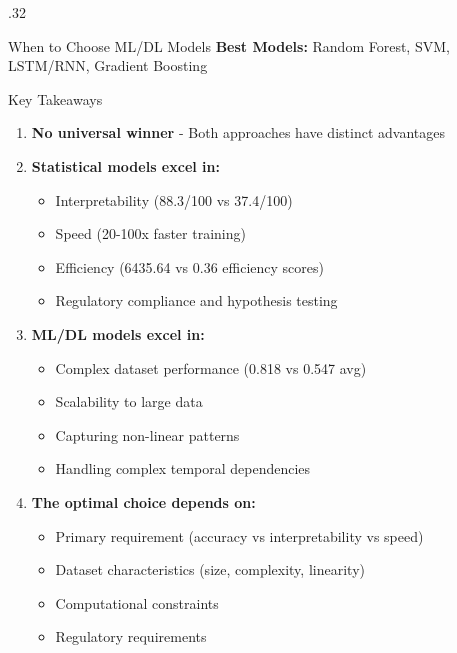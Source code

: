 \documentclass[final]{beamer}
\begin{document}
\begin{frame}[t]
\begin{columns}[t]
\begin{column}{.32\linewidth}
\begin{block}{When to Choose ML/DL Models}
\vspace{0.3cm}
\textbf{Best Models:} Random Forest, SVM, LSTM/RNN, Gradient Boosting
\end{block}

\begin{block}{Key Takeaways}
\begin{enumerate}
    \item \textbf{No universal winner} - Both approaches have distinct advantages
    
    \item \textbf{Statistical models excel in:}
    \begin{itemize}
        \item Interpretability (88.3/100 vs 37.4/100)
        \item Speed (20-100x faster training)
        \item Efficiency (6435.64 vs 0.36 efficiency scores)
        \item Regulatory compliance and hypothesis testing
    \end{itemize}
    
    \item \textbf{ML/DL models excel in:}
    \begin{itemize}
        \item Complex dataset performance (0.818 vs 0.547 avg)
        \item Scalability to large data
        \item Capturing non-linear patterns
        \item Handling complex temporal dependencies
    \end{itemize}
    
    \item \textbf{The optimal choice depends on:}
    \begin{itemize}
        \item Primary requirement (accuracy vs interpretability vs speed)
        \item Dataset characteristics (size, complexity, linearity)
        \item Computational constraints
        \item Regulatory requirements
    \end{itemize}
\end{enumerate}
\end{block}

\end{column}
\end{columns}


\end{frame}
\end{document}
